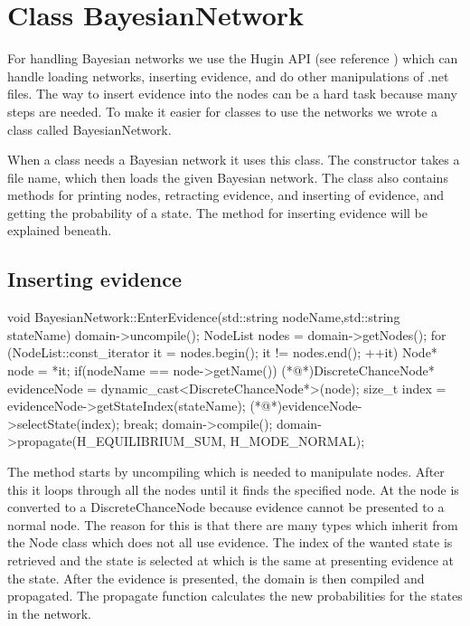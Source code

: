 \section{Class BayesianNetwork}
	For handling Bayesian networks we use the Hugin API (see reference \cite{hugin_api}) which can handle loading networks, inserting evidence, and do other manipulations of .net files. The way to insert evidence into the nodes can be a hard task because many steps are needed. To make it easier for classes to use the networks we wrote a class called BayesianNetwork.

	When a class needs a Bayesian network it uses this class. The constructor takes a file name, which then loads the given 
	Bayesian network. The class also contains methods for printing nodes, retracting evidence, and inserting of evidence, and getting the probability of a state. 
	The method for inserting evidence will be explained beneath.
	\subsection*{Inserting evidence}
		\begin{Sourcecode}[caption=EnterEvidence method]
void BayesianNetwork::EnterEvidence(std::string nodeName,std::string stateName){
domain->uncompile();
NodeList nodes = domain->getNodes();
for (NodeList::const_iterator it = nodes.begin(); it != nodes.end(); ++it)
{
	Node* node = *it;
	if(nodeName == node->getName())
	{
		(*@\lnote@*)DiscreteChanceNode* evidenceNode = dynamic_cast<DiscreteChanceNode*>(node);
		size_t index = evidenceNode->getStateIndex(stateName);
		(*@\lnote@*)evidenceNode->selectState(index);
		break;
	}
}
domain->compile();
domain->propagate(H_EQUILIBRIUM_SUM, H_MODE_NORMAL);
}
		\end{Sourcecode}
		The method starts by uncompiling which is needed to manipulate nodes. After this it loops through all the nodes until it finds the specified 
		node. At  the node is converted to a DiscreteChanceNode because evidence cannot be presented to a normal node. The reason for this 
		is that there are many types which inherit from the Node class which does not all use evidence. The index of the wanted state is retrieved and the state is selected at  which is the same at presenting evidence at the state. After the evidence is presented, the 
		domain is then compiled and propagated. The propagate function calculates the new probabilities for the states in the network.